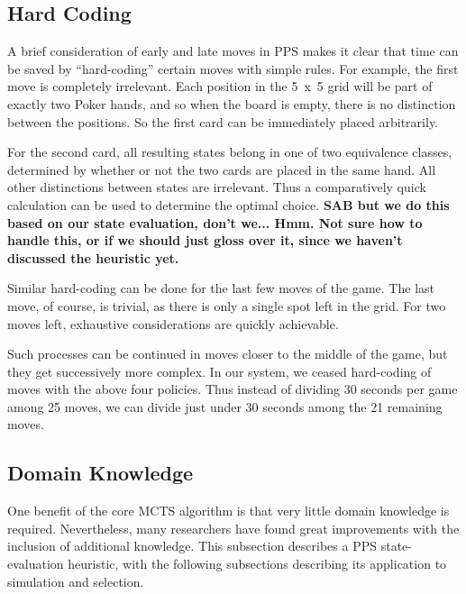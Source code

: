 \documentclass[letterpaper]{article}
\begin{document}

\subsection{Hard Coding}



A brief consideration of early and late moves in PPS makes it clear that time can be saved by ``hard-coding'' certain moves with simple rules. For example, the first move is completely irrelevant. Each position in the 5~x~5 grid will be part of exactly two Poker hands, and so when the board is empty, there is no distinction between the positions. So the first card can be immediately placed arbitrarily.

For the second card, all resulting states belong in one of two equivalence classes, determined by whether or not the two cards are placed in the same hand. All other distinctions between states are irrelevant. Thus a comparatively quick calculation can be used to determine the optimal choice. {\bf SAB but we do this based on our state evaluation, don't we... Hmm. Not sure how to handle this, or if we should just gloss over it, since we haven't discussed the heuristic yet.}

Similar hard-coding can be done for the last few moves of the game. The last move, of course, is trivial, as there is only a single spot left in the grid. For two moves left, exhaustive considerations are quickly achievable.

Such processes can be continued in moves closer to the middle of the game, but they get successively more complex. In our system, we ceased hard-coding of moves with the above four policies. Thus instead of dividing 30 seconds per game among 25 moves, we can divide just under 30 seconds among the 21 remaining moves. 

\subsection{Domain Knowledge}

One benefit of the core MCTS algorithm is that very little domain knowledge is required. Nevertheless, many researchers have found great improvements with the inclusion of additional knowledge. This subsection describes a PPS state-evaluation heuristic, with the following subsections describing its application to simulation and selection.
\end{document}
